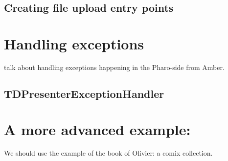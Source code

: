 \documentclass[a4paper,10pt,twoside]{book}
\begin{document}
\section{ Creating file upload entry points}\chapter{ Handling exceptions}
\begin{todo}

talk about handling exceptions happening in the Pharo-side from Amber.
\end{todo}
\section{ TDPresenterExceptionHandler}\chapter{ A more advanced example: }
We should use the example of the book of Olivier: a comix collection. 
\end{document}
